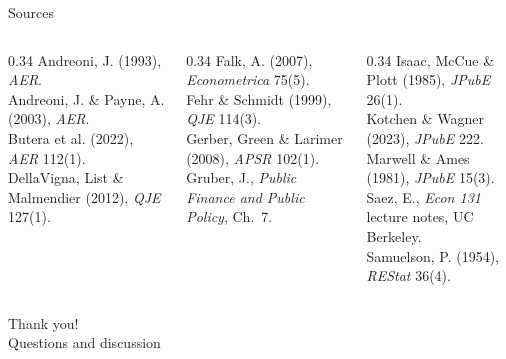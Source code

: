 \documentclass[11pt,aspectratio=169]{beamer}
\begin{document}
\begin{frame}{Sources}
  \tiny
  \begin{columns}[T]
    \begin{column}{0.34\textwidth}
      Andreoni, J. (1993), \emph{AER}.\\
      Andreoni, J. \& Payne, A. (2003), \emph{AER}.\\
      Butera et al. (2022), \emph{AER} 112(1).\\
      DellaVigna, List \& Malmendier (2012), \emph{QJE} 127(1).
    \end{column}
    \begin{column}{0.34\textwidth}
      Falk, A. (2007), \emph{Econometrica} 75(5).\\
      Fehr \& Schmidt (1999), \emph{QJE} 114(3).\\
      Gerber, Green \& Larimer (2008), \emph{APSR} 102(1).\\
      Gruber, J., \emph{Public Finance and Public Policy}, Ch.\ 7.
    \end{column}
    \begin{column}{0.34\textwidth}
      Isaac, McCue \& Plott (1985), \emph{JPubE} 26(1).\\
      Kotchen \& Wagner (2023), \emph{JPubE} 222.\\
      Marwell \& Ames (1981), \emph{JPubE} 15(3).\\
      Saez, E., \emph{Econ 131} lecture notes, UC Berkeley.\\
      Samuelson, P. (1954), \emph{REStat} 36(4).
    \end{column}
  \end{columns}
\end{frame}

\begin{frame}[standout]
  Thank you!\\
  \vspace{0.5em}
  \small Questions and discussion
\end{frame}
\end{document}
